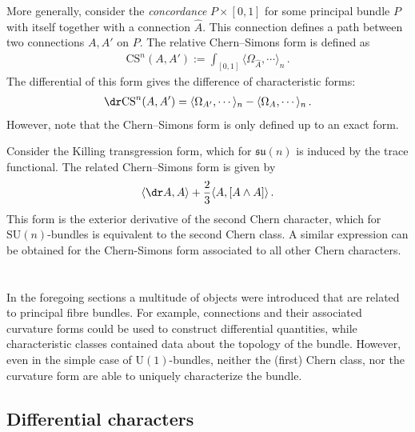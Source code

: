     More generally, consider the \textit{concordance} $P\times[0,1]$ for some principal bundle $P$ with itself together with a connection $\hat{A}$. This connection defines a path between two connections $A,A'$ on $P$. The relative Chern--Simons form is defined as
    \begin{gather}
        \mathrm{CS}^n(A,A') := \int_{[0,1]}\langle\Omega_{\hat{A}},\cdots\rangle_n\,.
    \end{gather}
    The differential of this form gives the difference of characteristic forms:
    \begin{gather}
        \dr\mathrm{CS}^n(A,A') = \langle\Omega_{A'},\cdots\rangle_n - \langle\Omega_A,\cdots\rangle_n\,.
    \end{gather}
    However, note that the Chern--Simons form is only defined up to an exact form.

    \begin{example}
        Consider the Killing transgression form, which for $\mathfrak{su}(n)$ is induced by the trace functional. The related Chern--Simons form is given by
        \begin{gather}
            \langle\dr A,A\rangle + \frac{2}{3}\langle A,[A\wedge A] \rangle\,.
        \end{gather}
        This form is the exterior derivative of the second Chern character, which for $\mathrm{SU}(n)$-bundles is equivalent to the second Chern class. A similar expression can be obtained for the Chern-Simons form associated to all other Chern characters.
    \end{example}

\section{}\label{section:differential_cohomology}

    In the foregoing sections a multitude of objects were introduced that are related to principal fibre bundles. For example, connections and their associated curvature forms could be used to construct differential quantities, while characteristic classes contained data about the topology of the bundle. However, even in the simple case of $\mathrm{U}(1)$-bundles, neither the (first) Chern class, nor the curvature form are able to uniquely characterize the bundle.

\subsection{Differential characters}

